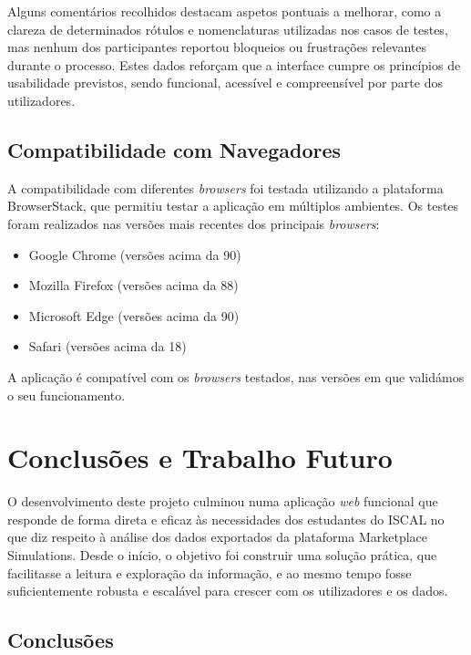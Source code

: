 Alguns comentários recolhidos destacam aspetos pontuais a melhorar, como a clareza de determinados rótulos e nomenclaturas utilizadas nos casos de testes, mas nenhum dos participantes reportou bloqueios ou frustrações relevantes durante o processo. Estes dados reforçam que a interface cumpre os princípios de usabilidade previstos, sendo funcional, acessível e compreensível por parte dos utilizadores.

\section{Compatibilidade com Navegadores}

A compatibilidade com diferentes \textit{browsers} foi testada utilizando a plataforma BrowserStack, que permitiu testar a aplicação em múltiplos ambientes. Os testes foram realizados nas versões mais recentes dos principais \textit{browsers}:

\begin{itemize}
    \item Google Chrome (versões acima da 90)
    \item Mozilla Firefox (versões acima da 88)
    \item Microsoft Edge (versões acima da 90)
    \item Safari (versões acima da 18)
\end{itemize}

A aplicação é compatível com os \textit{browsers} testados, nas versões em que validámos o seu funcionamento.

\chapter{Conclusões e Trabalho Futuro}
\label{ch:conclusoesTrabalhoFuturo}

O desenvolvimento deste projeto culminou numa aplicação \textit{web} funcional que responde de forma direta e eficaz às necessidades dos estudantes do ISCAL no que diz respeito à análise dos dados exportados da plataforma Marketplace Simulations. Desde o início, o objetivo foi construir uma solução prática, que facilitasse a leitura e exploração da informação, e ao mesmo tempo fosse suficientemente robusta e escalável para crescer com os utilizadores e os dados.

\section{Conclusões}


